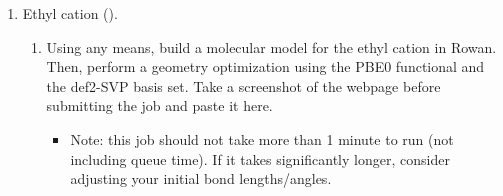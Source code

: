 \documentclass[../psets.tex]{subfiles}
\begin{document}
\begin{enumerate}
\begin{enumerate}
\begin{enumerate}
            \begin{proof}
                {\color{white}hi}\\
                C       -0.75677857 -0.05411065 0.03565919\\
                C       0.75677857 0.05411065 -0.03565919\\
                H       -1.15393947 -0.71157723 -0.75360372\\
                H       -1.23964754 0.92846958 -0.08395828\\
                H       -1.08879565 -0.46588635 1.00165110\\
                H       1.08879566 0.46588615 -1.00165118\\
                H       1.15393946 0.71157739 0.75360359\\
                H       1.23964755 -0.92846954 0.08395849
            \end{proof}
            \item What is the calculated optimized  bond distance? What is the  bond angle(s)?\footnote{Per Jonathan's 9/24 Canvas announcement, provide at least 4 significant figures for bond lengths and angles. If you previously had issues obtaining these values from Rowan, please try again as the problem should be resolved now. If you are still unable to get 4 significant figures from Rowan, contact Jonathan.}
            \begin{proof}
                 bond distance: \SI{1.519}{\angstrom}.\\
                 bond angle: \ang{107.26}.
            \end{proof}
        \end{enumerate}
        \item Ethyl cation ().
        \begin{enumerate}
            \item Using any means, build a molecular model for the ethyl cation in Rowan. Then, perform a geometry optimization using the PBE0 functional and the def2-SVP basis set. Take a screenshot of the webpage before submitting the job and paste it here.
            \begin{itemize}
                \item Note: this job should not take more than 1 minute to run (not including queue time). If it takes significantly longer, consider adjusting your initial bond lengths/angles.
            \end{itemize}

\end{enumerate}
\end{enumerate}
\end{enumerate}
\end{document}
